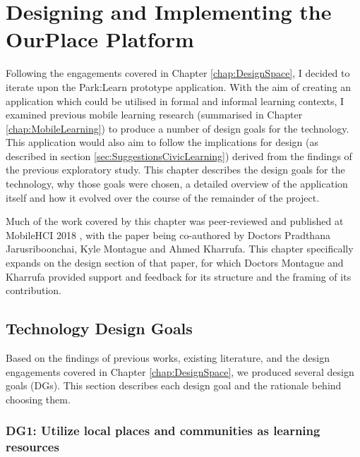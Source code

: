 \chapter{Designing and Implementing the OurPlace Platform}
\label{chap:Design}

Following the engagements covered in Chapter \ref{chap:DesignSpace}, I decided to iterate upon the Park:Learn prototype application. With the aim of creating an application which could be utilised in formal and informal learning contexts, I examined previous mobile learning research (summarised in Chapter \ref{chap:MobileLearning}) to produce a number of design goals for the technology. This application would also aim to follow the implications for design (as described in section \ref{sec:SuggestionsCivicLearning}) derived from the findings of the previous exploratory study. This chapter describes the design goals for the technology, why those goals were chosen, a detailed overview of the application itself and how it evolved over the course of the remainder of the project. 

Much of the work covered by this chapter was peer-reviewed and published at MobileHCI 2018 \citep{Richardson2018}, with the paper being co-authored by Doctors Pradthana Jarusriboonchai, Kyle Montague and Ahmed Kharrufa. This chapter specifically expands on the design section of that paper, for which Doctors Montague and Kharrufa provided support and feedback for its structure and the framing of its contribution.

\section{Technology Design Goals}
\label{sec:DesignGoals}
Based on the findings of previous works, existing literature, and the design engagements covered in Chapter \ref{chap:DesignSpace}, we produced several design goals (DGs). This section describes each design goal and the rationale behind choosing them.


\subsection*{ DG1: Utilize local places and communities as learning resources }
\label{DG1}

